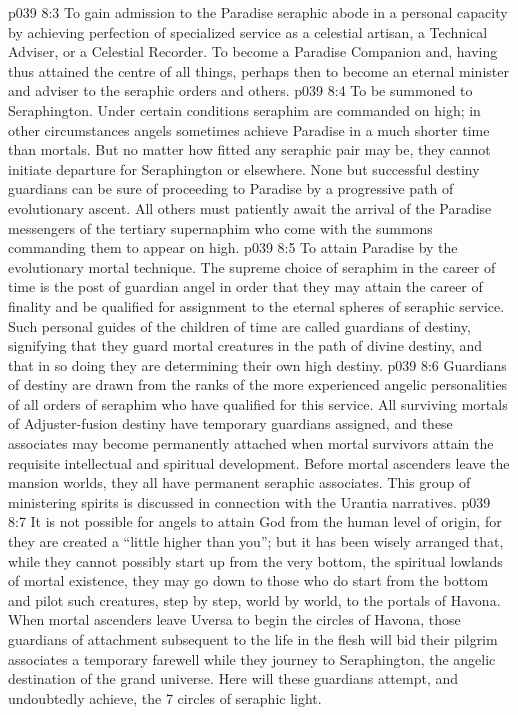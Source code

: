 \vs p039 8:3 \bibnobreakspace To gain admission to the Paradise seraphic abode in a personal capacity by achieving perfection of specialized service as a celestial artisan, a Technical Adviser, or a Celestial Recorder. To become a Paradise Companion and, having thus attained the centre of all things, perhaps then to become an eternal minister and adviser to the seraphic orders and others.
\vs p039 8:4 \bibnobreakspace To be summoned to Seraphington. Under certain conditions seraphim are commanded on high; in other circumstances angels sometimes achieve Paradise in a much shorter time than mortals. But no matter how fitted any seraphic pair may be, they cannot initiate departure for Seraphington or elsewhere. None but successful destiny guardians can be sure of proceeding to Paradise by a progressive path of evolutionary ascent. All others must patiently await the arrival of the Paradise messengers of the tertiary supernaphim who come with the summons commanding them to appear on high.
\vs p039 8:5 \bibnobreakspace To attain Paradise by the evolutionary mortal technique. The supreme choice of seraphim in the career of time is the post of guardian angel in order that they may attain the career of finality and be qualified for assignment to the eternal spheres of seraphic service. Such personal guides of the children of time are called guardians of destiny, signifying that they guard mortal creatures in the path of divine destiny, and that in so doing they are determining their own high destiny.
\vs p039 8:6 Guardians of destiny are drawn from the ranks of the more experienced angelic personalities of all orders of seraphim who have qualified for this service. All surviving mortals of Adjuster\hyp{}fusion destiny have temporary guardians assigned, and these associates may become permanently attached when mortal survivors attain the requisite intellectual and spiritual development. Before mortal ascenders leave the mansion worlds, they all have permanent seraphic associates. This group of ministering spirits is discussed in connection with the Urantia narratives.
\vs p039 8:7 \pc It is not possible for angels to attain God from the human level of origin, for they are created a “little higher than you”; but it has been wisely arranged that, while they cannot possibly start up from the very bottom, the spiritual lowlands of mortal existence, they may go down to those who do start from the bottom and pilot such creatures, step by step, world by world, to the portals of Havona. When mortal ascenders leave Uversa to begin the circles of Havona, those guardians of attachment subsequent to the life in the flesh will bid their pilgrim associates a temporary farewell while they journey to Seraphington, the angelic destination of the grand universe. Here will these guardians attempt, and undoubtedly achieve, the 7 circles of seraphic light.
